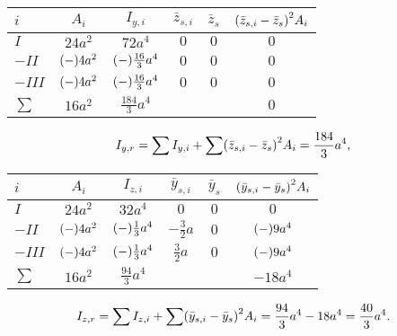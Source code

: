 \documentclass{exercise}
\begin{document}
\begin{enumerate}
\begin{enumerate}
            \begin{center}
                \begin{tabular}{lccccc}
                    \toprule
                    \(i\) & \(A_i\) & \(I_{y, i}\) & \(\bar{z}_{s, i}\) & \(\bar{z}_s\) & \(\parentheses*{\bar{z}_{s, i} - \bar{z}_s}^2 A_i\)\\
                    \midrule
                    \(I\) & \(24a^2\) & \(72a^4\) & \(0\) & \(0\) & \(0\)\\
                    \(-II\) & \(\parentheses*{-}4a^2\) & \(\parentheses*{-}\frac{16}{3}a^4\) & \(0\) & \(0\) & \(0\)\\
                    \(-III\) & \(\parentheses*{-}4a^2\) & \(\parentheses*{-}\frac{16}{3}a^4\) & \(0\) & \(0\) & \(0\)\\
                    \midrule
                    \(\sum\) & \(16a^2\) & \(\frac{184}{3}a^4\) & & & \(0\)\\
                    \bottomrule
                \end{tabular}
            \end{center}
            \[
                I_{y, r} = \sum I_{y, i} + \sum\parentheses*{\bar{z}_{s, i} - \bar{z}_s}^2 A_i = \frac{184}{3}a^4,
            \]
            \begin{center}
                \begin{tabular}{lccccc}
                    \toprule
                    \(i\) & \(A_i\) & \(I_{z, i}\) & \(\bar{y}_{s, i}\) & \(\bar{y}_s\) & \(\parentheses*{\bar{y}_{s, i} - \bar{y}_s}^2 A_i\)\\
                    \midrule
                    \(I\) & \(24a^2\) & \(32a^4\) & \(0\) & \(0\) & \(0\)\\
                    \(-II\) & \(\parentheses*{-}4a^2\) & \(\parentheses*{-}\frac{1}{3}a^4\) & \(-\frac{3}{2}a\) & \(0\) & \(\parentheses*{-}9a^4\)\\
                    \(-III\) & \(\parentheses*{-}4a^2\) & \(\parentheses*{-}\frac{1}{3}a^4\) & \(\frac{3}{2}a\) & \(0\) & \(\parentheses*{-}9a^4\)\\
                    \midrule
                    \(\sum\) & \(16a^2\) & \(\frac{94}{3}a^4\) & & & \(-18a^4\)\\
                    \bottomrule
                \end{tabular}
            \end{center}
            \[
                I_{z, r} = \sum I_{z, i} + \sum\parentheses*{\bar{y}_{s, i} - \bar{y}_s}^2 A_i = \frac{94}{3}a^4 - 18a^4 = \frac{40}{3}a^4.
\]
\end{enumerate}
\end{enumerate}
\end{document}

